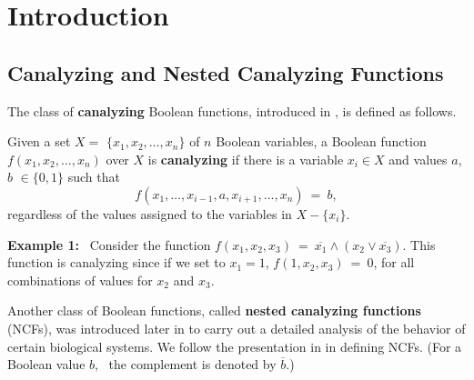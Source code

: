 \section{Introduction} 
\label{sec:intro}

\subsection{Canalyzing and Nested Canalyzing Functions}
\label{sse:ncf_def}

The class of \textbf{canalyzing} Boolean functions, introduced 
in \cite{Kauffman-1969}, is defined as follows.

\begin{definition}\label{def:canalyzing}
Given a set $X = $ $\{x_1, x_2, \ldots, x_n\}$ of $n$  Boolean variables,
a Boolean function $f(x_1, x_2, \ldots, x_n)$ over $X$ is \textbf{canalyzing}
if there is a variable $x_i \in X$ and values $a$, $b$ $\in \{0,1\}$ such that
\[
f(x_1, \ldots, x_{i-1}, a, x_{i+1}, \ldots, x_n) ~=~ b, 
\]
regardless of the values assigned to the variables in $X - \{x_i\}$.
\end{definition}

\medskip

\noindent
\textbf{Example 1:}~ Consider the function 
$f(x_1, x_2, x_3) ~=~ \overline{x_1} \wedge (x_2 \vee \overline{x_3})$.
This function is canalyzing since if we set to $x_1 = 1$,
$f(1, x_2, x_3) ~=~ 0$, for all combinations of values for 
$x_2$ and $x_3$. %

\medskip

Another class of Boolean functions, called \textbf{nested canalyzing functions} (NCFs),
was introduced later in \cite{Kauffman-etal-2003} to carry out a detailed
analysis of the behavior of certain biological systems.
We follow the presentation in \cite{Layne-2011} in defining NCFs.
(For a Boolean value $b$,~ the complement is denoted by $\overline{b}$.)

